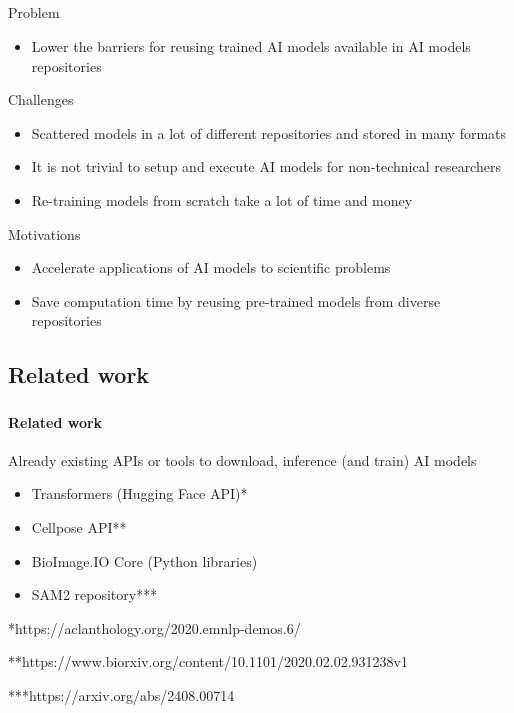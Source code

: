 \subsection{\slidetitle}
\begin{frame}
  \frametitle{\sectiontitle}
  \framesubtitle{\slidetitle}

  Problem
  \begin{itemize}
    \item Lower the barriers for reusing trained AI models available in AI models repositories
  \end{itemize}

  Challenges
  \begin{itemize}
    \item Scattered models in a lot of different repositories and stored in many formats
    \item It is not trivial to setup and execute AI models for non-technical researchers
    \item Re-training models from scratch take a lot of time and money
  \end{itemize}

  Motivations
  \begin{itemize}
    \item Accelerate applications of AI models to scientific problems
    \item Save computation time by reusing pre-trained models from diverse repositories
  \end{itemize}
\end{frame}

\def\slidetitle{Related work}

\subsection{\slidetitle}
\begin{frame}
  \frametitle{\sectiontitle}
  \framesubtitle{\slidetitle}

  Already existing APIs or tools to download, inference (and train) AI models
  \begin{itemize}
    \item Transformers (Hugging Face API)*
    \item Cellpose API**
    \item BioImage.IO Core (Python libraries)
    \item SAM2 repository***
  \end{itemize}

  \bigskip
  \bigskip

  *https://aclanthology.org/2020.emnlp-demos.6/

  **https://www.biorxiv.org/content/10.1101/2020.02.02.931238v1

  ***https://arxiv.org/abs/2408.00714
\end{frame}

